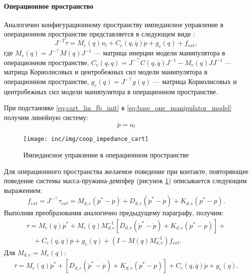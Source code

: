 \paragraph{Операционное пространство}
Аналогично конфигурационному пространству импедансное управление в операционном пространстве представляется в следующем виде \cite{Yoshikawa2000}:
\begin{equation}
   J^{-T}\tau = M_e(q)u_l + C_e(q,\dot{q})\dot{p} + g_e(q) + f_{ext},
   \label{eq:cart_lin_fb_init}
\end{equation}
где $M_e(q) = J^{-\top} M(q) J^{-1}$ --- матрица инерции модели манипулятора в операционном пространстве, $C_e(q, \dot{q}) = J^{-\top} C(q,\dot{q}) J^{-1} - M_e(q) \dot{J} J^{-1}$ --- матрица Кориолисовых и центробежных сил модели манипулятора в операционном пространстве, $g_e(q) = J^{-\top} g(q)$ --- матрица Кориолисовых и центробежных сил модели манипулятора в операционном пространстве.

При подстановке  \eqref{eq:cart_lin_fb_init} в \eqref{eq:base_one_manipulator_model} получим линейную систему:
\begin{equation}
  \ddot{p} = u_l
  \label{eq:cart_lin_fb_res}
\end{equation}
\begin{figure}[ht]
  \centering
  \texttt{[image: inc/img/coop\_impedance\_cart]}
  \caption{Импедансное управление в операционном пространстве}
  \label{fig:os_impedance}
\end{figure}

Для операционного пространства желаемое поведение при контакте, повторяющее поведение системы масса-пружина-демпфер (рисунок \ref{fig:os_impedance}) описывается следующим выражением:
\begin{equation}
  f_{ext} = J^{-\top} \tau_{ext}  = M_{d,e}(\ddot{p}^* - \ddot{p}) +  D_{d,e} (\dot{p}^* - \dot{p}) + K_{d,e} (p^* - p).
  \label{eq:cart_impedance_ref}
\end{equation}
Выполняя преобразования аналогично предыдущему параграфу, получим:
\begin{equation}
  \begin{split}
    \tau = M_e(q)\ddot{p}^* + M_e(q)M_{d,e}^{-1}\left[ D_{d,e}(\dot{p}^* - \dot{p}) + K_{d,e} (p^* - p)\right]+ \\
      \quad+ C_e(q,\dot{q})\dot{p} + g_e(q) + \left(I - M(q)M_{d,e}^{-1}\right)f_{ext}.
  \end{split}
  \label{eq:cart_impedance_final}
\end{equation}
Для $M_{d,e} = M_e(q)$:
\begin{equation}
  \begin{split}
    \tau = M_e(q)\ddot{p}^* + \left[ D_{d,e}(\dot{p}^* - \dot{p}) + K_{d,e} (p^* - p)\right] + C_e(q,\dot{q})\dot{p} + g_e(q).
  \end{split}
  \label{eq:cart_impedance_without_fs}
\end{equation}

